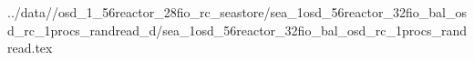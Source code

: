 ../data//osd_1_56reactor_28fio_rc_seastore/sea_1osd_56reactor_32fio_bal_osd_rc_1procs_randread_d/sea_1osd_56reactor_32fio_bal_osd_rc_1procs_randread.tex